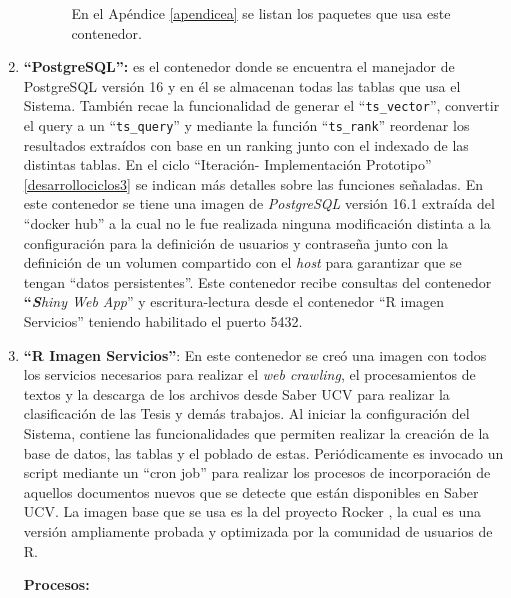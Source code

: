 \documentclass[
  12pt,
  openany]{book}
\begin{document}
\begin{enumerate}
\begin{enumerate}
\begin{enumerate}
      En el Apéndice \ref{apendicea} se listan los paquetes que usa este contenedor.
    \end{enumerate}
  \end{enumerate}
\item
  \textbf{``PostgreSQL'':} es el contenedor donde se encuentra el manejador de PostgreSQL versión 16 y en él se almacenan todas las tablas que usa el Sistema. También recae la funcionalidad de generar el ``\texttt{ts\_vector}'', convertir el query a un ``\texttt{ts\_query}'' y mediante la función ``\texttt{ts\_rank}'' reordenar los resultados extraídos con base en un ranking junto con el indexado de las distintas tablas. En el ciclo ``Iteración- Implementación Prototipo'' \ref{desarrollociclos3} se indican más detalles sobre las funciones señaladas. En este contenedor se tiene una imagen de \emph{PostgreSQL} versión 16.1 extraída del ``docker hub'' a la cual no le fue realizada ninguna modificación distinta a la configuración para la definición de usuarios y contraseña junto con la definición de un volumen compartido con el \emph{host} para garantizar que se tengan ``datos persistentes''. Este contenedor recibe consultas del contenedor \textbf{``\emph{S}}\emph{hiny Web App}'' y escritura-lectura desde el contenedor ``R imagen Servicios'' teniendo habilitado el puerto 5432.
\item
  \textbf{``R Imagen Servicios''}: En este contenedor se creó una imagen con todos los servicios necesarios para realizar el \emph{web crawling}, el procesamientos de textos y la descarga de los archivos desde Saber UCV para realizar la clasificación de las Tesis y demás trabajos. Al iniciar la configuración del Sistema, contiene las funcionalidades que permiten realizar la creación de la base de datos, las tablas y el poblado de estas. Periódicamente es invocado un script mediante un ``cron job'' para realizar los procesos de incorporación de aquellos documentos nuevos que se detecte que están disponibles en Saber UCV. La imagen base que se usa es la del proyecto Rocker \citep{RJ-2017-065:2017}, la cual es una versión ampliamente probada y optimizada por la comunidad de usuarios de R.

  \textbf{Procesos:}


\end{enumerate}
\end{document}
